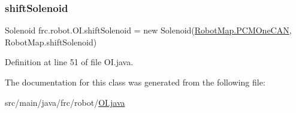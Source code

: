 \subsubsection{\texorpdfstring{shift\+Solenoid}{shiftSolenoid}}
{\footnotesize\ttfamily Solenoid frc.\+robot.\+O\+I.\+shift\+Solenoid = new Solenoid(\hyperlink{classfrc_1_1robot_1_1RobotMap_a79a848df56d706c787d9a4f9a0434e7f}{Robot\+Map.\+P\+C\+M\+One\+C\+AN}, Robot\+Map.\+shift\+Solenoid)\hspace{0.3cm}{\ttfamily [static]}}



Definition at line 51 of file O\+I.\+java.



The documentation for this class was generated from the following file\+:\begin{DoxyCompactItemize}
\item 
src/main/java/frc/robot/\hyperlink{OI_8java}{O\+I.\+java}\end{DoxyCompactItemize}
